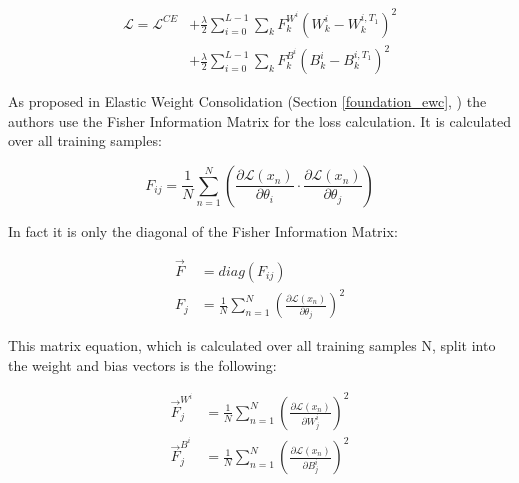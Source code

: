 \begin{equation}
    \begin{split}
        \mathcal{L} = \mathcal{L}^{CE}
        & + \frac{\lambda}{2} \sum_{i=0}^{L-1} \sum_{k} F_{k}^{W^i}\left(W^i_{k}-W^{i,{T_1}}_{k} \right)^2
        \\
        & +  \frac{\lambda}{2}\sum_{i=0}^{L-1} \sum_{k}F^{B^i}_k\left(B^i_{k}-B^{i,{T_1}}_{k} \right)^2
    \end{split}
\end{equation}

As proposed in Elastic Weight Consolidation (Section \ref{foundation_ewc}, \cite{elastic-weight-consolidation}) the authors use the Fisher Information Matrix for the loss calculation. It is calculated over all training samples:

\begin{equation}
    F_{ij} = 
    \frac{1}{N} 
    \sum_{n=1}^{N} 
    \left(
        \frac{\partial \mathcal{L} \left( x_n \right) }{\partial \theta_{i}} 
        \cdot 
        \frac{\partial \mathcal{L} \left( x_n \right) }{\partial \theta_{j}}
    \right)
\end{equation}

In fact it is only the diagonal of the Fisher Information Matrix:

\begin{equation}
    \begin{split}
        \vec{F} & = diag \left( F_{ij} \right)
        \\
        F_{j} & = 
        \frac{1}{N} 
        \sum_{n=1}^{N} 
        \left(
            \frac{\partial \mathcal{L} \left( x_n \right) }{\partial \theta_{j}}
        \right)^2
    \end{split}
\end{equation}

This matrix equation, which is calculated over all training samples N, split into the weight and bias vectors is the following:

\begin{equation}
    \begin{split}
        \vec{F}^{W^i}_j & = 
        \frac{1}{N} 
        \sum_{n=1}^{N} 
        \left(
            \frac{\partial \mathcal{L} \left( x_n \right) }{\partial W^i_{j}}
        \right)^2
        \\
        \vec{F}^{B^i}_j & = 
        \frac{1}{N} 
        \sum_{n=1}^{N} 
        \left(
            \frac{\partial \mathcal{L} \left( x_n \right) }{\partial B^i_{j}}
        \right)^2
    \end{split}
\end{equation}

